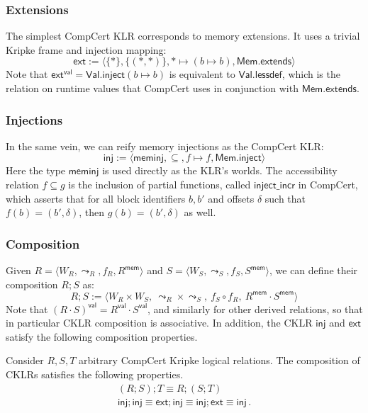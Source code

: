 \documentclass[acmsmall,timestamp,review,anonymous]{acmart}
\newcommand{\kw}[1]{\ensuremath{ \mathsf{#1} }}
\begin{document}

\subsubsection{Extensions} %

The simplest CompCert KLR corresponds to memory extensions.
It uses a trivial Kripke frame and injection mapping:
\[
  \kw{ext} :=
    \langle \{*\}, \{(*,*)\}, * \mapsto (b \mapsto b), \kw{Mem.extends} \rangle
\]
Note that $\kw{ext}^\kw{val} = \kw{Val.inject}(b \mapsto b)$
is equivalent to $\kw{Val.lessdef}$,
which is the relation on runtime values that
CompCert uses in conjunction with \kw{Mem.extends}.


\subsubsection{Injections} %

In the same vein,
we can reify memory injections as the CompCert KLR:
\[
  \kw{inj} :=
    \langle
      \kw{meminj},
      {\subseteq}, %
      f \mapsto f,
      \kw{Mem.inject}
    \rangle
\]
Here the type \kw{meminj} is used directly
as the KLR's worlds.
The accessibility relation $f \subseteq g$
is the inclusion of partial functions,
called $\kw{inject\_incr}$ in CompCert,
which asserts that for all block identifiers $b, b'$ and offsets $\delta$
such that $f(b) = (b', \delta)$,
then $g(b) = (b', \delta)$ as well.


\subsubsection{Composition} %

Given
$R = \langle W_R, {\leadsto}_R, f_R, R^\kw{mem} \rangle$ and
$S = \langle W_S, {\leadsto}_S, f_S, S^\kw{mem} \rangle$,
we can define
their composition $R ; S$ as:
\[
  R ; S := \langle
    W_R \times W_S, \:
    {\leadsto}_R \times {\leadsto}_S, \:
    f_S \circ f_R, \:
    R^\kw{mem} \cdot S^\kw{mem}
  \rangle
\]
Note that
$(R \cdot S)^\kw{val} = R^\kw{val} \cdot S^\kw{val}$,
and similarly for other derived relations,
so that in particular CKLR composition is associative.
In addition, the CKLR \kw{inj} and \kw{ext}
satisfy the following composition properties.

\begin{lemma}
Consider $R, S, T$ arbitrary CompCert Kripke logical relations.
The composition of CKLRs satisfies the following properties.
\begin{gather*}
  (R ; S) ; T \equiv R ; (S ; T) \\
  \kw{inj} ; \kw{inj} \equiv
    \kw{ext} ; \kw{inj} \equiv
    \kw{inj} ; \kw{ext} \equiv
    \kw{inj} \,.
\end{gather*}
\end{lemma}
\end{document}
